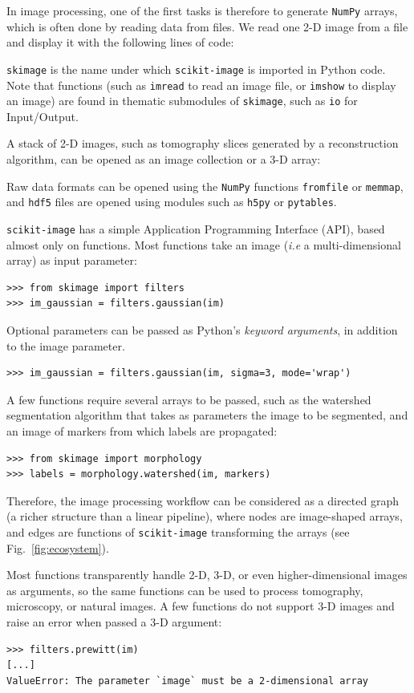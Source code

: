 \documentclass[twocolumn]{bmcart}%
\begin{document}
In image processing, one of the first tasks is therefore to generate
\texttt{NumPy} arrays, which is often done by reading data from files. We
read one 2-D image from a file and display it with the following lines of code:

 

\texttt{skimage} is the name under which \texttt{scikit-image} is imported in
Python code. Note that functions (such as \texttt{imread} to read an image
file, or \texttt{imshow} to display an image) are found in thematic submodules of
\texttt{skimage}, such as \texttt{io} for Input/Output.

A stack of 2-D images, such as tomography slices generated by a reconstruction algorithm, can be opened as an image collection or a 3-D array:

Raw data formats can be opened using the \texttt{NumPy} functions \texttt{fromfile} or \texttt{memmap}, and \texttt{hdf5} files are opened using modules such as \texttt{h5py} or \texttt{pytables}.

\texttt{scikit-image} has a simple Application Programming Interface
(API), based almost only on
functions. Most functions take an image (\emph{i.e} a multi-dimensional
array) as input parameter:
\begin{lstlisting}
>>> from skimage import filters
>>> im_gaussian = filters.gaussian(im)
\end{lstlisting}

Optional parameters can be passed as Python's \emph{keyword arguments},
in addition to the image parameter.
\begin{lstlisting}
>>> im_gaussian = filters.gaussian(im, sigma=3, mode='wrap')
\end{lstlisting}
A few functions require several arrays to be passed, such as the
watershed segmentation algorithm that takes as parameters the image to be
segmented, and an image of markers from which labels are propagated:
\begin{lstlisting}
>>> from skimage import morphology
>>> labels = morphology.watershed(im, markers)
\end{lstlisting}
Therefore, the image processing workflow can be considered as a directed graph
(a richer structure than a linear pipeline), where nodes are image-shaped arrays, and
edges are functions of \texttt{scikit-image} transforming the arrays (see
Fig.~\ref{fig:ecosystem}).

Most functions transparently handle 2-D, 3-D, or even higher-dimensional
images as arguments, so
the same functions can be used to process tomography, microscopy, or natural
images. A few functions do not support 3-D images and raise an error
when passed a 3-D argument:
\begin{lstlisting}
>>> filters.prewitt(im)
[...]
ValueError: The parameter `image` must be a 2-dimensional array
\end{lstlisting}
\end{document}
